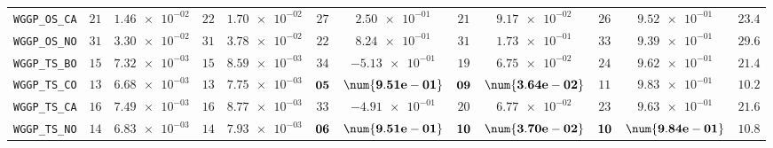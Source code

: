 \begin{table}[H]
\begin{tabularx}{\textwidth}{l||cC|cC|cC|cC|cC||c}
		\texttt{WGGP\_OS\_CA} & $ 21$ & $ \num{1.46e-02}$ & $ 22$ & $ \num{1.70e-02}$ & $ 27$ & $ \num{2.50e-01}$ & $ 21$ & $ \num{9.17e-02}$ & $ 26$ & $ \num{9.52e-01}$ & $ 23.4$  \\
		\texttt{WGGP\_OS\_NO} & $ 31$ & $ \num{3.30e-02}$ & $ 31$ & $ \num{3.78e-02}$ & $ 22$ & $ \num{8.24e-01}$ & $ 31$ & $ \num{1.73e-01}$ & $ 33$ & $ \num{9.39e-01}$ & $ 29.6$  \\
		\texttt{WGGP\_TS\_BO} & $ 15$ & $ \num{7.32e-03}$ & $ 15$ & $ \num{8.59e-03}$ & $ 34$ & $ \num{-5.13e-01}$ & $ 19$ & $ \num{6.75e-02}$ & $ 24$ & $ \num{9.62e-01}$ & $ 21.4$  \\
		\texttt{WGGP\_TS\_CO} & $ 13$ & $ \num{6.68e-03}$ & $ 13$ & $ \num{7.75e-03}$ & $\bf 05$ & $\bf \num{9.51e-01}$ & $\bf 09$ & $\bf \num{3.64e-02}$ & $ 11$ & $ \num{9.83e-01}$ & $ 10.2$  \\
		\texttt{WGGP\_TS\_CA} & $ 16$ & $ \num{7.49e-03}$ & $ 16$ & $ \num{8.77e-03}$ & $ 33$ & $ \num{-4.91e-01}$ & $ 20$ & $ \num{6.77e-02}$ & $ 23$ & $ \num{9.63e-01}$ & $ 21.6$  \\
		\texttt{WGGP\_TS\_NO} & $ 14$ & $ \num{6.83e-03}$ & $ 14$ & $ \num{7.93e-03}$ & $\bf 06$ & $\bf \num{9.51e-01}$ & $\bf 10$ & $\bf \num{3.70e-02}$ & $\bf 10$ & $\bf \num{9.84e-01}$ & $ 10.8$  \\
	\end{tabularx}
\end{table}
